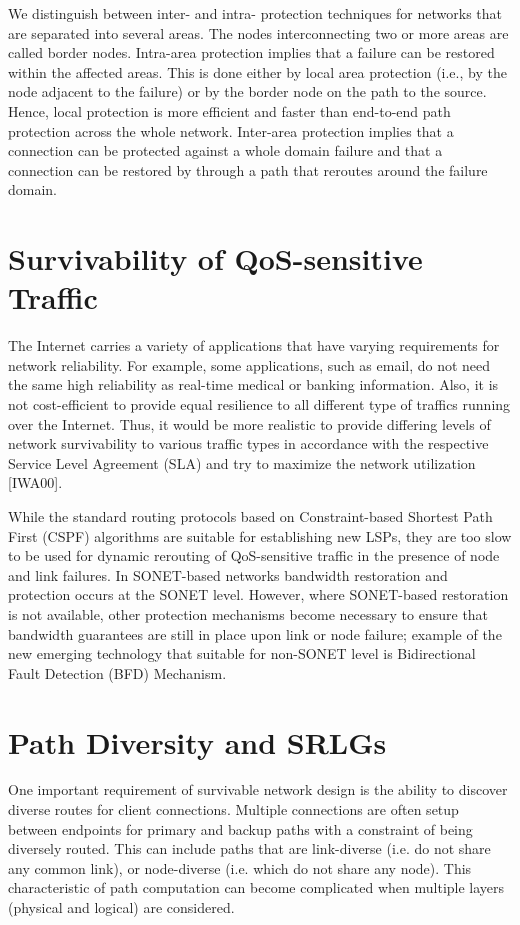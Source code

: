 We distinguish between inter- and intra- protection techniques for
networks that are separated into several areas. The nodes interconnecting
two or more areas are called border nodes. Intra-area protection implies
that a failure can be restored within the affected areas. This is
done either by local area protection (i.e., by the node adjacent to
the failure) or by the border node on the path to the source. Hence,
local protection is more efficient and faster than end-to-end path
protection across the whole network. Inter-area protection implies
that a connection can be protected against a whole domain failure
and that a connection can be restored by through a path that reroutes
around the failure domain.


\section{Survivability of QoS-sensitive Traffic}

The Internet carries a variety of applications that have varying requirements
for network reliability. For example, some applications, such as email,
do not need the same high reliability as real-time medical or banking
information. Also, it is not cost-efficient to provide equal resilience
to all different type of traffics running over the Internet. Thus,
it would be more realistic to provide differing levels of network
survivability to various traffic types in accordance with the respective
Service Level Agreement (SLA) and try to maximize the network utilization
{[}IWA00].

While the standard routing protocols based on Constraint-based Shortest
Path First (CSPF) algorithms are suitable for establishing new LSPs,
they are too slow to be used for dynamic rerouting of QoS-sensitive
traffic in the presence of node and link failures. In SONET-based
networks bandwidth restoration and protection occurs at the SONET
level. However, where SONET-based restoration is not available, other
protection mechanisms become necessary to ensure that bandwidth guarantees
are still in place upon link or node failure; example of the new emerging
technology that suitable for non-SONET level is Bidirectional Fault
Detection (BFD) Mechanism.


\section{Path Diversity and SRLGs}

One important requirement of survivable network design is the ability
to discover diverse routes for client connections. Multiple connections
are often setup between endpoints for primary and backup paths with
a constraint of being diversely routed. This can include paths that
are link-diverse (i.e. do not share any common link), or node-diverse
(i.e. which do not share any node). This characteristic of path computation
can become complicated when multiple layers (physical and logical)
are considered.

